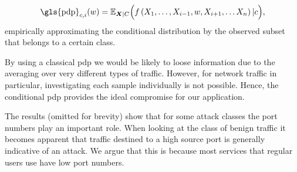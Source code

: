 \documentclass[conference]{IEEEtran}
\newcommand\note[2]{{\color{#1}#2}}
\newcommand\todo[1]{{\note{red}{TODO: #1}}}
\begin{document}
\begin{equation} \label{eq:pdp_conditional}
\text{\gls{pdp}}_{c,i}(w) = \mathbb E_{\boldsymbol X | C} \Big(f \left( X_1,\ldots,X_{i-1},w,X_{i+1},\ldots X_n \right) | c\Big),
\end{equation}
empirically approximating the conditional distribution by the observed subset that belongs to a certain class.

By using a classical \gls{pdp} we would be likely to loose information due to the averaging over very different types of traffic. However, for network traffic in particular, investigating each sample individually is not possible. Hence, the conditional \gls{pdp} provides the ideal compromise for our application.

%
%
%

The results (omitted for brevity) show that for some attack classes the port numbers play an important role. When looking at the class of benign traffic %
it becomes apparent that traffic destined to a high source port is generally indicative of an attack. We argue that this is because most services that regular users use have low port numbers.

\end{document}
